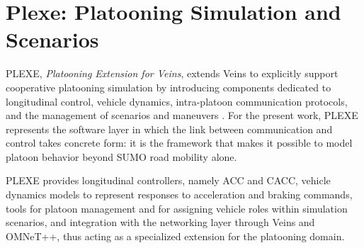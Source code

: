 \section{Plexe: Platooning Simulation and Scenarios}
\label{env:plexe}

PLEXE, \emph{Platooning Extension for Veins}, extends Veins to explicitly support cooperative platooning simulation by introducing components dedicated to longitudinal control, vehicle dynamics, intra-platoon communication protocols, and the management of scenarios and maneuvers \cite{segata2014plexe}. For the present work, PLEXE represents the software layer in which the link between communication and control takes concrete form: it is the framework that makes it possible to model platoon behavior beyond SUMO road mobility alone.

PLEXE provides longitudinal controllers, namely ACC and CACC, vehicle dynamics models to represent responses to acceleration and braking commands, tools for platoon management and for assigning vehicle roles within simulation scenarios, and integration with the networking layer through Veins and OMNeT++, thus acting as a specialized extension for the platooning domain.
